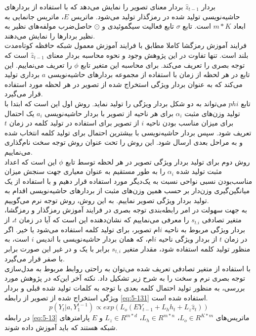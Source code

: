 بردار $\hat{z}_{t-1}$ بردار معنای تصویر را نمایش می‌دهد که با استفاده از بردارهای حاشیه‌نویسی تولید شده در رمزگذار تولید می‌شود. ماتریس $E$، ماتریس جانمایی به ابعاد $m * K$ است. تابع $\sigma$ تابع فعالیت سیگموئیدی و $\odot$ حاصل‌ضرب مولفه‌های نظیر به نظیر بردارها را نمایش می‌دهند.
\\
فرایند آموزش رمزگشا کاملا مطابق با فرایند آموزش معمول شبکه حافظه کوتاه‌مدت بلند است. تنها تفاوت در این پژوهش وجود و نحوه محاسبه بردار معنای $\hat{z}_{t-1}$  است که توجه بصری را تعریف می‌کند. برای محاسبه این متغیر تابع $\phi$ را تعریف می‌نماییم. این تابع در هر لحظه از زمان با استفاده از مجموعه بردارهای حاشیه‌نویسی $a$ برداری تولید می‌کند که به عنوان بردار ویژگی‌ استخراج شده از تصویر در هر لحظه مورد استفاده قرار می‌گیرد.
\\
تابع $phi$ می‌تواند به دو شکل بردار ویژگی را تولید نماید. روش اول این است که ابتدا با تولید وزن‌های مثبت $\alpha_i$ برای هر ناحیه از تصویر با بردار حاشیه‌نویسی $a_i$ یک احتمال برای میزان مناسب بودن ناحیه $i$ از تصویر برای استفاده در تولید کلمه در زمان $t$ تعریف شود. سپس بردار حاشیه‌نویسی با بیشترین احتمال برای تولید کلمه انتخاب شده و به مراحل بعدی ارسال شود. این روش را تحت عنوان روش توجه سخت نام‌گذاری می‌نماییم.
\\
روش دوم برای تولید بردار ویژگی تصویر در هر لحظه توسط تابع $\phi$ این است که اعداد مثبت تولید شده $\alpha_i$ را به طور مستقیم به عنوان معیاری جهت سنجش میزان مناسب‌بودن نسبی نواحی نسبت به یک‌دیگر مورد استفاده قرار دهیم و با استفاده از یک میانگین‌گیری وزن‌دار بر حسب همین وزن‌های مثبت از بردارهای حاشیه‌نویسی اقدام به تولید بردار ویژگی تصویر نماییم. به این روش، روش توجه نرم  می‌گوییم.
\\
به جهت سهولت در امر رابطه‌بندی توجه بصری در فرایند آموزش رمزگذار و رمزگشا، متغیر تصادفی $s_{t.i}$ را معرفی می‌نماییم که نشان‌دهنده این است که آیا در زمان $t$، از بردار ویژگی مربوط به ناحیه $i$ام تصویر، برای تولید کلمه استفاده می‌شود یا خیر. اگر در زمان $t$ از بردار ویژگی ناحیه $i$ام، که همان بردار حاشیه‌نویسی با اندیس $i$ است، به منظور تولید کلمه استفاده شود، مقدار متغیر $s_{t,i}$ برابر با یک و در غیر این‌ صورت برابر با صفر قرار می‌‌گیرد.
\\
با استفاده از متغیر تصادفی تعریف شده می‌توان به راحتی روابط مربوط به مدل‌سازی توجه بصری نرم و سخت را به شرح زیر تشکیل داد. نکته آخر این‌که در پژوهش مورد بررسی، به منظور تولید احتمال کلمه بعدی با توجه به کلمات تولید شده قبلی و بردار ویژگی استخراج شده از تصویر از رابطه \eqref{eq:5-131} استفاده شده است.
\begin{equation}
p(Y_t | a, Y_1^{t-1}) \propto exp(L_o(EY_{t-1} + L_h h_{t} + L_z \hat{z}_t)) 
\label{eq:5-131}
\end{equation}
در رابطه \eqref{eq:5-13} ماتریس‌های $L_o \in R^{K*m}$، $L_h \in R^{m*n}$، $L_z \in R^{m*d}$ و $E$ پارامترهای شبکه هستند که باید آموزش داده شوند.

